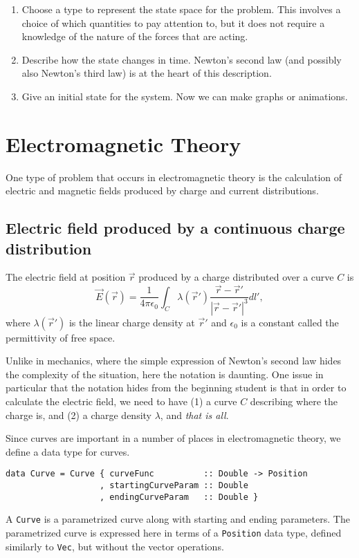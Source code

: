 \documentclass[11pt]{article}
\newcommand{\abs}[1]{\left| #1 \right|}
\begin{document}
\begin{enumerate}
\item Choose a type to represent the state space for the problem.
This involves a choice of which quantities to pay attention to,
but it does not require a knowledge of the nature of the forces
that are acting.
\item Describe how the state changes in time.  Newton's second law
(and possibly also Newton's third law) is at the heart of this description.
\item Give an initial state for the system.
Now we can make graphs or animations.
\end{enumerate}

\section{Electromagnetic Theory}

One type of problem that occurs in electromagnetic theory is the
calculation of electric and magnetic fields produced by charge
and current distributions.

\subsection{Electric field produced by a continuous charge distribution}

The electric field at position $\vec{r}$ produced by a charge distributed over a curve $C$ is
\begin{equation}
\vec{E}(\vec{r}) = \frac{1}{4 \pi \epsilon_0} \int_C \lambda(\vec{r}') \frac{\vec{r} - \vec{r}'}{\abs{\vec{r} - \vec{r}'}^3} dl' ,
\label{efield}
\end{equation}
where $\lambda(\vec{r}')$ is the linear charge density at $\vec{r}'$
and $\epsilon_0$ is a constant called the permittivity of free space.

Unlike in mechanics, where the simple expression of Newton's second law hides
the complexity of the situation, here the notation is daunting.
One issue in particular that the notation hides from the beginning student
is that in order to calculate the electric field, we need to have (1)
a curve $C$ describing where the charge is, and (2) a charge density $\lambda$,
and \emph{that is all}.

Since curves are important in a number of places in electromagnetic theory,
we define a data type for curves.
\begin{verbatim}
data Curve = Curve { curveFunc          :: Double -> Position
                   , startingCurveParam :: Double
                   , endingCurveParam   :: Double }
\end{verbatim}
A \verb|Curve| is a parametrized curve along with starting and ending
parameters.  The parametrized curve is expressed here in terms of a
\verb|Position| data type, defined similarly to \verb|Vec|, but without
the vector operations.
\end{document}
